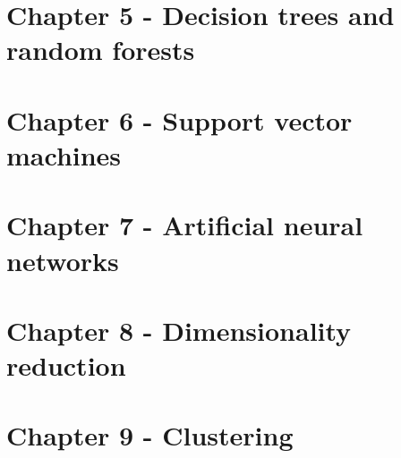 \documentclass[]{book}
\theoremstyle{definition}
\theoremstyle{definition}
\theoremstyle{remark}
\begin{document}
\section{Chapter 5 - Decision trees and random
forests}\label{solutions-decision-trees}

\section{Chapter 6 - Support vector machines}\label{solutions-svm}

\section{Chapter 7 - Artificial neural networks}\label{solutions-ann}

\section{Chapter 8 - Dimensionality
reduction}\label{solutions-dimensionality-reduction}

\section{Chapter 9 - Clustering}\label{solutions-clustering}


\end{document}
